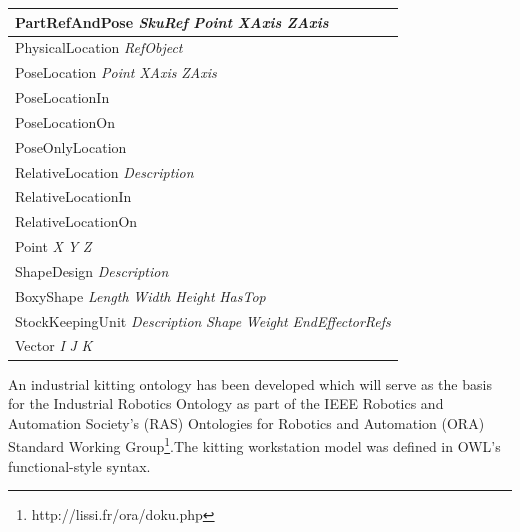 \documentclass[preprint,12pt]{elsarticle}
\newcommand{\class}[1] {\textsf{#1}}
\begin{document}
\begin{table}[!h!t]
{\begin{tabular}{l}
\\\midrule
\hspace{5 mm}\class{PartRefAndPose} \textit{SkuRef} \textit{Point} \textit{XAxis} \textit{ZAxis}
\\\midrule
\hspace{5 mm}\class{PhysicalLocation} \textit{RefObject}
\\\midrule
\hspace{10 mm}\class{PoseLocation} \textit{Point} \textit{XAxis} \textit{ZAxis}
\\\midrule
\hspace{15 mm}\class{PoseLocationIn}
\\\midrule
\hspace{15 mm}\class{PoseLocationOn}
\\\midrule
\hspace{15 mm}\class{PoseOnlyLocation}
\\\midrule
\hspace{10 mm}\class{RelativeLocation} \textit{Description}
\\\midrule
\hspace{15 mm}\class{RelativeLocationIn}
\\\midrule
\hspace{15 mm}\class{RelativeLocationOn}
\\\midrule
\hspace{5 mm}\class{Point} \textit{X} \textit{Y} \textit{Z}
\\\midrule
\hspace{5 mm}\class{ShapeDesign} \textit{Description}
\\\midrule
\hspace{10 mm}\class{BoxyShape} \textit{Length} \textit{Width} \textit{Height} \textit{HasTop}
\\\midrule
\hspace{5 mm}\class{StockKeepingUnit} \textit{Description} \textit{Shape} \textit{Weight} \textit{EndEffectorRefs}
\\\midrule
\hspace{5 mm}\class{Vector} \textit{I} \textit{J} \textit{K}
\\\bottomrule
\end{tabular}
}
\end{table}

An industrial kitting ontology has been developed which will serve as the basis for the Industrial Robotics Ontology as part of the IEEE Robotics and Automation Society's (RAS) Ontologies for Robotics and Automation (ORA) Standard Working Group\footnote{http://lissi.fr/ora/doku.php}.The kitting workstation model was defined in OWL's functional-style syntax.
\end{document}
